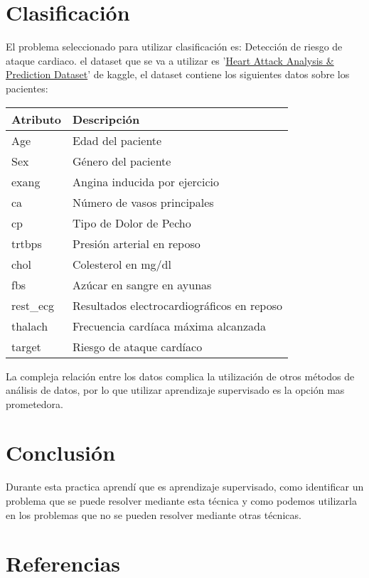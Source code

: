 \documentclass[11pt]{article}
\begin{document}
\section{Clasificación}
\label{sec:org3a0b7f0}
El problema seleccionado para utilizar clasificación es: Detección de
riesgo de ataque cardiaco. el dataset que se va a utilizar es '\href{https://www.kaggle.com/datasets/rashikrahmanpritom/heart-attack-analysis-prediction-dataset?select=heart.css}{Heart Attack
Analysis \& Prediction Dataset}' de kaggle, el dataset contiene
los siguientes datos sobre los pacientes:

\begin{center}
\begin{tabularx}{0.8\textwidth}{l|l}
Atributo & Descripción\\
\hline
Age & Edad del paciente\\
Sex & Género del paciente\\
exang & Angina inducida por ejercicio\\
ca & Número de vasos principales\\
cp & Tipo de Dolor de Pecho\\
trtbps & Presión arterial en reposo\\
chol & Colesterol en mg/dl\\
fbs & Azúcar en sangre en ayunas\\
rest\_ecg & Resultados electrocardiográficos en reposo\\
thalach & Frecuencia cardíaca máxima alcanzada\\
target & Riesgo de ataque cardíaco\\
\end{tabularx}

\end{center}

La compleja relación entre los datos complica la utilización de otros
métodos de análisis de datos, por lo que utilizar aprendizaje
supervisado es la opción mas prometedora.


\section{Conclusión}
\label{sec:org26aadf7}
Durante esta practica aprendí que es aprendizaje supervisado, como
identificar un problema que se puede resolver mediante esta técnica y
como podemos utilizarla en los problemas que no se pueden resolver
mediante otras técnicas. 


\section{Referencias}
\label{sec:orgb4831cf}
\printbibliography[heading=none]
\end{document}

